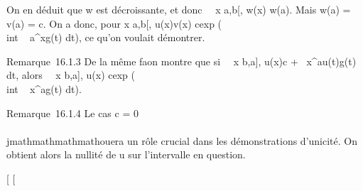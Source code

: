 On en déduit que w est décroissante, et donc
\forall~~x \in {[}a,b{[}, w(x) \leq w(a). Mais w(a) = v(a)
= c. On a donc, pour x \in {[}a,b{[}, \textbar{}u(x)\textbar{}\leq v(x) \leq
cexp (\\int ~
a^xg(t) dt), ce qu'on voulait démontrer.

Remarque~16.1.3 De la même fa\ccon on montre que si
\forall~~x \in{]}b,a{]}, \textbar{}u(x)\textbar{}\leq c
+\int ~
x^a\textbar{}u(t)\textbar{}g(t) dt, alors
\forall~~x \in{]}b,a{]}, \textbar{}u(x)\textbar{}\leq
cexp (\\int ~
x^ag(t) dt).

Remarque~16.1.4 Le cas c = 0 \\\\jmathmathmathmathouera un rôle crucial dans les
démonstrations d'unicité. On obtient alors la nullité de u sur
l'intervalle en question.

{[}
{[}
